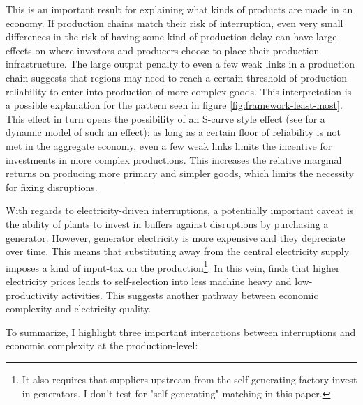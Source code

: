 \documentclass[11pt]{article}
\begin{document}
  This is an important result for explaining what kinds of products are made in an economy. If production chains match their risk of interruption, even very small differences in the risk of having some kind of production delay can have large effects on where investors and producers choose to place their production infrastructure. The large output penalty to even a few weak links in a production chain suggests that regions may need to reach a certain threshold of production reliability to enter into production of more complex goods. This interpretation is a possible explanation for the pattern seen in figure \ref{fig:framework-least-most}. This effect in turn opens the possibility of an S-curve style effect (see \cite{brummitt_contagious_2017} for a dynamic model of such an effect): as long as a certain floor of reliability is not met in the aggregate economy, even a few weak links limits the incentive for investments in more complex productions. This increases the relative marginal returns on producing more primary and simpler goods, which limits the necessity for fixing disruptions.

With regards to electricity-driven interruptions, a potentially important caveat is the ability of plants to invest in buffers against disruptions by purchasing a generator. However, generator electricity is more expensive and they depreciate over time. This means that substituting away from the central electricity supply imposes a kind of input-tax on the production\footnote{It also requires that suppliers upstream from the self-generating factory invest in generators. I don't test for "self-generating" matching in this paper.}. In this vein, \cite{abeberese_electricity_2017} finds that higher electricity prices leads to self-selection into less machine heavy and low-productivity activities. This suggests another pathway between economic complexity and electricity quality. 

To summarize, I highlight three important interactions between interruptions and economic complexity at the production-level:
\end{document}
